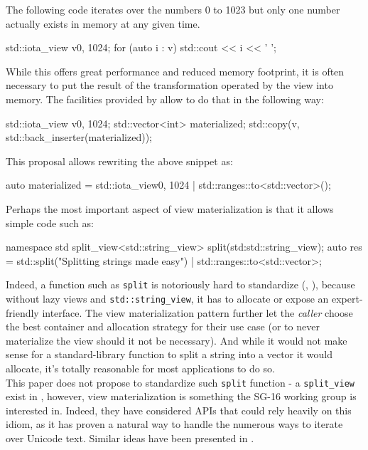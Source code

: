 \documentclass{wg21}
\newcommand{\cc}[1]{\texttt{#1}}
\begin{document}
The following code iterates over the numbers 0 to 1023 but only one number actually exists in memory at any given time.
\begin{codeblock}
std::iota_view v{0, 1024};
for (auto i : v) {
    std::cout << i << ' ';
}
\end{codeblock}

While this offers great performance and reduced memory footprint, it is often necessary to put the result of the transformation operated by the view into memory.
The facilities provided by \cite{P0896R3} allow to do that in the following way:


\begin{codeblock}
    std::iota_view v{0, 1024};
    std::vector<int> materialized;
    std::copy(v, std::back_inserter(materialized));
\end{codeblock}

This proposal allows rewriting the above snippet as:

\begin{codeblock}
    auto materialized = std::iota_view{0, 1024} | std::ranges::to<std::vector>();
\end{codeblock}


Perhaps the most important aspect of view materialization is that it allows simple code such as:

\begin{codeblock}
    namespace std {
        split_view<std::string_view> split(std:std::string_view);
    }
    auto res = std::split("Splitting strings made easy") 
    	       | std::ranges::to<std::vector>;
\end{codeblock}

Indeed, a function such as \cc{split} is notoriously hard to standardize (\cite{P0540},  \cite{N3593}), because without lazy views and \cc{std::string_view}, it has to allocate or expose an expert-friendly interface.
The view materialization pattern further let the \emph{caller} choose the best container and allocation strategy for their use case (or to never materialize the view should it not be necessary).
And while it would not make sense for a standard-library function to split a string into a vector it would allocate, it's totally reasonable for most applications to do so.\\

This paper does not propose to standardize such \cc{split} function - a \cc{split_view} exist in \cite{P0896R3}, however, view materialization is something the SG-16 working group is interested in.
Indeed, they have considered APIs that could rely heavily on this idiom, as it has proven a natural way to handle the numerous ways to iterate over Unicode text.
Similar ideas have been presented in \cite{P1004}.
\end{document}
